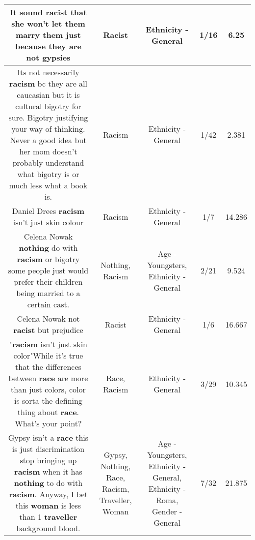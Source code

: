 \documentclass[11pt]{article}
\newlength\mylength
\begin{document}
\begin{center}
\begin{longtable}{|C{.65\mylength}|C{.30\mylength}|C{.12\mylength}|C{.12\mylength}|C{.12\mylength}|}
  \small It sound \textbf{racist} that she won't let them marry them just because they are not gypsies\normalsize   & Racist & Ethnicity - General & 1/16 & 6.25 \\  \hline
  \small Its not necessarily \textbf{racism} bc they are all caucasian but it is cultural bigotry for sure. Bigotry justifying your way of thinking. Never a good idea but her mom doesn't probably understand what bigotry is or much less what a book is.\normalsize   & Racism & Ethnicity - General & 1/42 & 2.381 \\  \hline
  \small Daniel Drees \textbf{racism} isn't just skin colour\normalsize   & Racism & Ethnicity - General & 1/7 & 14.286 \\  \hline
  \small Celena Nowak \textbf{nothing} do with \textbf{racism} or bigotry some people just would prefer their children being married to a certain cast.\normalsize   & Nothing, Racism & Age - Youngsters, Ethnicity - General & 2/21 & 9.524 \\  \hline
  \small Celena Nowak not \textbf{racist} but prejudice\normalsize   & Racist & Ethnicity - General & 1/6 & 16.667 \\  \hline
  \small "\textbf{racism} isn't just skin color"While it's true that the differences between \textbf{race} are more than just colors, color is sorta the defining thing about \textbf{race}. What's your point?\normalsize   & Race, Racism & Ethnicity - General & 3/29 & 10.345 \\  \hline
  \small Gypsy isn't a \textbf{race} this is just discrimination stop bringing up \textbf{racism} when it has \textbf{nothing} to do with \textbf{racism}. Anyway, I bet this \textbf{woman} is less than 1 \textbf{traveller} background blood.\normalsize   & Gypsy, Nothing, Race, Racism, Traveller, Woman & Age - Youngsters, Ethnicity - General, Ethnicity - Roma, Gender - General & 7/32 & 21.875 \\  \hline

\end{longtable}
\end{center}
\end{document}
